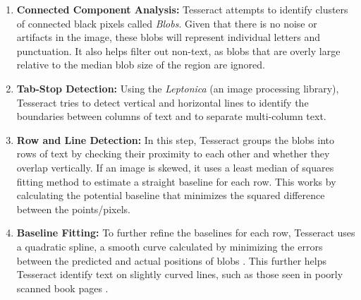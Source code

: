 \documentclass[10pt,twocolumn]{article}
\begin{document}
\begin{enumerate}
    \item \textbf{Connected Component Analysis:} Tesseract attempts to identify clusters of connected black pixels called \textit{Blobs}. Given that there is no noise or artifacts in the image, these blobs will represent individual letters and punctuation. It also helps filter out non-text, as blobs that are overly large relative to the median blob size of the region are ignored.
    
    \item \textbf{Tab-Stop Detection:} Using the \textit{Leptonica} (an image processing library), Tesseract tries to detect vertical and horizontal lines to identify the boundaries between columns of text and to separate multi-column text.
    
    \item \textbf{Row and Line Detection:} In this step, Tesseract groups the blobs into rows of text by checking their proximity to each other and whether they overlap vertically. If an image is skewed, it uses a least median of squares fitting method to estimate a straight baseline for each row. This works by calculating the potential baseline that minimizes the squared difference between the points/pixels.
    
    \item \textbf{Baseline Fitting:} To further refine the baselines for each row, Tesseract uses a quadratic spline, a smooth curve calculated by minimizing the errors between the predicted and actual positions of blobs \cite{geeks}. This further helps Tesseract identify text on slightly curved lines, such as those seen in poorly scanned book pages \cite{Overview_Smith} \cite{Overview_Akhil}.

    
\end{enumerate}
\end{document}
